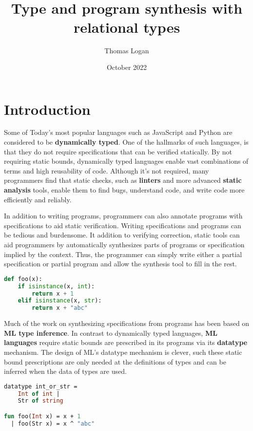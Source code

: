 \documentclass[sigplan,screen]{acmart}
\title{Type and program synthesis with relational types}
\author{Thomas Logan}
\date{October 2022}
\begin{document}
\maketitle

\section{Introduction}
Some of Today's most popular languages such as JavaScript and Python are considered to be \textbf{dynamically typed}.
One of the hallmarks of such languages, is that they do not require specifications 
that can be verified statically. By not requiring static bounds, dynamically typed languages
enable vast combinations of terms and high reusability of code. 
Although it's not required, many programmers find that
static checks, such as \textbf{linters} and more advanced \textbf{static analysis} tools, 
enable them to find bugs, understand code, and write code more efficiently and reliably. 

In addition to writing programs, programmers can also annotate programs with specifications to
aid static verification. Writing specifications and programs can be tedious and burdensome.  
It addition to verifying correction, static tools can aid programmers by automatically synthesizes
parts of programs or specification implied by the context. Thus, the programmer can simply write
either a partial specification or partial program and allow the synthesis tool to fill in the rest.   

\begin{lstlisting}[language=Python]
def foo(x):
    if isinstance(x, int):
        return x + 1 
    elif isinstance(x, str): 
        return x + "abc"
\end{lstlisting}

Much of the work on synthesizing specifications from programs has been based on \textbf{ML type inference}.
In contrast to dynamically typed languages, \textbf{ML languages} require static bounds are prescribed 
in its programs via its \textbf{datatype} mechanism. The design of ML's datatype mechanism is clever, 
such these static bound prescriptions are only needed at the definitions of types and can be 
inferred when the data of types are used.

\begin{lstlisting}[language=ML]
datatype int_or_str = 
    Int of int | 
    Str of string

fun foo(Int x) = x + 1
  | foo(Str x) = x ^ "abc"
\end{lstlisting}
\end{document}
